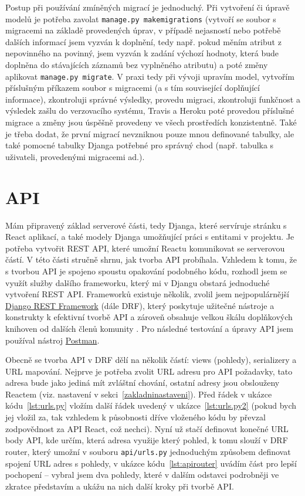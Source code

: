     Postup při používání zmíněných migrací je jednoduchý. Při vytvoření či úpravě modelů je potřeba zavolat \verb|manage.py makemigrations| (vytvoří se soubor s migracemi na základě provedených úprav, v případě nejasností nebo potřebě dalších informací jsem vyzván k doplnění, tedy např. pokud měním atribut z nepovinného na povinný, jsem vyzván k zadání výchozí hodnoty, která bude doplněna do stávajících záznamů bez vyplněného atributu) a poté změny aplikovat \verb|manage.py migrate|. V praxi tedy při vývoji upravím model, vytvořím příslušným příkazem soubor s migracemi (a s tím související doplňující informace), zkontroluji správné výsledky, provedu migraci, zkontroluji funkčnost a výsledek zašlu do verzovacího systému, Travis a Heroku poté provedou příslušné migrace a změny jsou úspěšně provedeny ve všech prostředích konzistentně. Také je třeba dodat, že první migrací nevzniknou pouze mnou definované tabulky, ale také pomocné tabulky Djanga potřebné pro správný chod (např. tabulka s uživateli, provedenými migracemi ad.).
    
    \section{API}\label{sec:api}
    Mám připravený základ serverové části, tedy Djanga, které servíruje stránku s React aplikací, a také modely Djanga umožňující práci s entitami v projektu. Je potřeba vytvořit REST API, které umožní Reactu komunikovat se serverovou částí. V této části stručně shrnu, jak tvorba API probíhala. Vzhledem k tomu, že s tvorbou API je spojeno spoustu opakování podobného kódu, rozhodl jsem se využít služby dalšího frameworku, který mi v Djangu obstará jednoduché vytvoření REST API. Frameworků existuje několik, zvolil jsem nejpopulárnější \href{http://www.django-rest-framework.org/}{Django REST Framework} (dále DRF), který poskytuje užitečné nástroje a konstrukty k efektivní tvorbě API a zároveň obsahuje velkou škálu doplňkových knihoven od dalších členů komunity \cite{drf2}. Pro následné testování a úpravy API jsem používal nástroj \href{https://www.getpostman.com/}{Postman}.
    
    Obecně se tvorba API v DRF dělí na několik částí: views (pohledy), serializery a URL mapování. Nejprve je potřeba zvolit URL adresu pro API požadavky, tato adresa bude jako jediná mít zvláštní chování, ostatní adresy jsou obslouženy Reactem (viz. nastavení v sekci~\ref{zakladninastaveni}). Před řádek v ukázce kódu~\ref{lst:urls.py} vložím další řádek uvedený v ukázce~\ref{lst:urls.py2} (pokud bych jej vložil za, tak vzhledem k působnosti dříve vloženého kódu by převzal zodpovědnost za API React, což nechci). Nyní už stačí definovat konečné URL body API, kde určím, která adresa využije který pohled, k tomu slouží v DRF router, který umožní v souboru \verb|api/urls.py| jednoduchým způsobem definovat spojení URL adres s pohledy, v ukázce kódu~\ref{lst:apirouter} uvádím část pro lepší pochopení -- vybral jsem dva pohledy, které v dalším odstavci podrobněji ve zkratce představím a ukážu na nich další kroky při tvorbě API.
    
